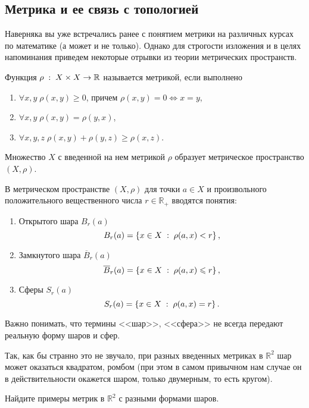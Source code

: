    \subsection{Метрика и ее связь с топологией}
   Наверняка вы уже встречались ранее с понятием метрики на различных курсах по математике (а может и не только). Однако для строгости изложения и в целях напоминания приведем некоторые отрывки из теории метрических пространств.
   \begin{Def}
       [Метрика]
       Функция $\rho\; : \; X \times X \to \mathbb{R}$ называется метрикой, если выполнено
       \begin{enumerate}
           \item $\forall x, y \; \rho(x,y) \geqslant 0$, причем $\rho(x,y) = 0 \Leftrightarrow x = y$,
           \item $\forall x,y \; \rho(x,y) = \rho(y,x)$,
           \item $\forall x,y,z \; \rho(x,y) + \rho(y,z) \geqslant \rho(x,z)$.
       \end{enumerate}
   \end{Def}
   \begin{Def}
       Множество $X$ с введенной на нем метрикой $\rho$ образует метрическое пространство $(X, \rho)$.
   \end{Def}

   \begin{Def}
       В метрическом пространстве $(X, \rho)$ для точки $a\in X$ и произвольного положительного вещественного числа $r\in \mathbb{R}_+$ вводятся понятия:
       \begin{enumerate}
           \item Открытого шара $B_r(a)$
               \[
                   B_r(a) = \left\{ x\in X \; : \; \rho(a, x) < r \right\},
               \] 
           \item Замкнутого шара $\overline{B}_r(a)$ 
               \[
                   \overline{B}_r(a) = \left\{ x\in X \; : \; \rho(a, x) \leqslant r \right \},
               \] 
           \item Сферы $S_r(a)$ 
               \[
                   S_r(a) = \left \{ x \in X \; : \; \rho (a, x) = r \right \}.
               \] 
       \end{enumerate}
   \end{Def}

   \begin{Note}
       Важно понимать, что термины <<шар>>, <<сфера>> не всегда передают реальную форму шаров и сфер. 

       Так, как бы странно это не звучало, при разных введенных метриках в $\mathbb{R}^2$ шар может оказаться квадратом, ромбом (при этом в самом привычном нам случае он в действительности окажется шаром, только двумерным, то есть кругом).
   \end{Note}
   \begin{Task}
       Найдите примеры метрик в $\mathbb{R}^2$ с разными формами шаров. 
   \end{Task}

